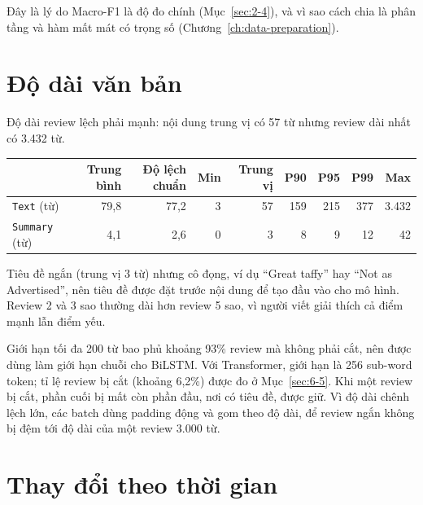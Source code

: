 Đây là lý do Macro-F1 là độ đo chính (Mục~\ref{sec:2-4}), và vì sao cách chia là phân tầng và hàm mất mát có trọng số (Chương~\ref{ch:data-preparation}).

\section{Độ dài văn bản}
\label{sec:4-4}

Độ dài review lệch phải mạnh: nội dung trung vị có 57 từ nhưng review dài nhất có 3.432 từ.

\begin{center}
\small
\begin{tabular}{@{}lrrrrrrrr@{}}
    \toprule
     & Trung bình & Độ lệch chuẩn & Min & Trung vị & P90 & P95 & P99 & Max \\
    \midrule
    \texttt{Text} (từ) & 79,8 & 77,2 & 3 & 57 & 159 & 215 & 377 & 3.432 \\
    \texttt{Summary} (từ) & 4,1 & 2,6 & 0 & 3 & 8 & 9 & 12 & 42 \\
    \bottomrule
\end{tabular}
\end{center}

Tiêu đề ngắn (trung vị 3 từ) nhưng cô đọng, ví dụ ``Great taffy'' hay ``Not as Advertised'', nên tiêu đề được đặt trước nội dung để tạo đầu vào cho mô hình. Review 2 và 3 sao thường dài hơn review 5 sao, vì người viết giải thích cả điểm mạnh lẫn điểm yếu.

Giới hạn tối đa 200 từ bao phủ khoảng 93\% review mà không phải cắt, nên được dùng làm giới hạn chuỗi cho BiLSTM. Với Transformer, giới hạn là 256 sub-word token; tỉ lệ review bị cắt (khoảng 6,2\%) được đo ở Mục~\ref{sec:6-5}. Khi một review bị cắt, phần cuối bị mất còn phần đầu, nơi có tiêu đề, được giữ. Vì độ dài chênh lệch lớn, các batch dùng padding động và gom theo độ dài, để review ngắn không bị đệm tới độ dài của một review 3.000 từ.

\section{Thay đổi theo thời gian}
\label{sec:4-5}

